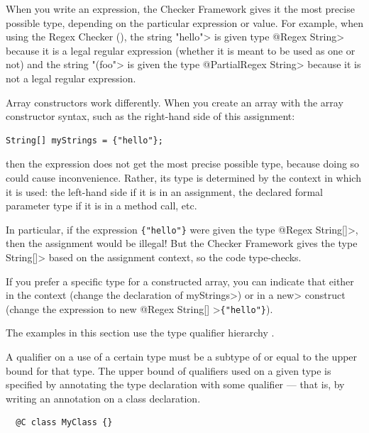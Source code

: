 
When you write an expression, the Checker Framework gives it the most
precise possible type, depending on the particular expression or value.
For example, when using the Regex Checker (),
the string \<"hello"> is given type \<@Regex String> because it is a legal
regular expression (whether it is meant to be used as one or not) and the
string \<"(foo"> is given the type \<@PartialRegex String> because it is not
a legal regular expression.

Array constructors work differently.  When you create an array with the
array constructor syntax, such as the right-hand side of this assignment:

\begin{Verbatim}
String[] myStrings = {"hello"};
\end{Verbatim}

\noindent
then the expression does not get the most precise possible type, because
doing so could cause inconvenience.  Rather, its type is determined by the
context in which it is used:  the left-hand side if it is in an assignment,
the declared formal parameter type if it is in a method call, etc.

In particular, if the expression \verb|{"hello"}| were given the type
\<@Regex String[]>, then the assignment would be illegal!  But the Checker
Framework gives the type \<String[]> based on the assignment context, so the code
type-checks.

If you prefer a specific type for a constructed array, you can indicate
that either in the context (change the declaration of \<myStrings>) or in a
\<new> construct (change the expression to \<new @Regex String[] >\verb|{"hello"}|).



The examples in this section use the type qualifier hierarchy .

A qualifier on a use of a certain type must be a subtype of or equal to the upper bound for that type.
The upper bound of qualifiers used on a given type is specified by annotating the type declaration
with some qualifier --- that is, by writing an annotation on a class declaration.
\begin{Verbatim}
  @C class MyClass {}
\end{Verbatim}

